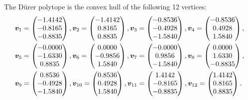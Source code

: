 \begin{example}
 The D\"urer polytope is the convex hull of the following 12 vertices:
 \begin{align*}
  \bm{v}_1 &= \begin{pmatrix} -1.4142\\   -0.8165\\   -0.8835 \end{pmatrix},
   \bm{v}_2 = \begin{pmatrix}-1.4142\\    0.8165\\    0.8835 \end{pmatrix}, 
   \bm{v}_3 = \begin{pmatrix}-0.8536\\   -0.4928\\   -1.5840 \end{pmatrix}, 
   \bm{v}_4 = \begin{pmatrix}-0.8536\\    0.4928\\    1.5840 \end{pmatrix}, \\
   \bm{v}_5 &= \begin{pmatrix}-0.0000\\   -1.6330\\    0.8835 \end{pmatrix}, 
   \bm{v}_6 = \begin{pmatrix} 0.0000\\   -0.9856\\    1.5840 \end{pmatrix}, 
   \bm{v}_7 = \begin{pmatrix}-0.0000\\    0.9856\\   -1.5840 \end{pmatrix}, 
   \bm{v}_8 = \begin{pmatrix} 0.0000\\    1.6330\\   -0.8835 \end{pmatrix}, \\ 
   \bm{v}_9 &= \begin{pmatrix}0.8536\\   -0.4928\\   -1.5840 \end{pmatrix}, 
   \bm{v}_{10} = \begin{pmatrix} 0.8536\\    0.4928\\    1.5840 \end{pmatrix}, 
   \bm{v}_{11} = \begin{pmatrix} 1.4142\\   -0.8165\\   -0.8835 \end{pmatrix}, 
   \bm{v}_{12} = \begin{pmatrix} 1.4142\\    0.8165\\    0.8835 \end{pmatrix}. 
 \end{align*}

\end{example}

